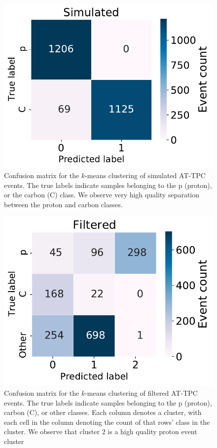 \documentclass[preprint,12pt]{elsarticle}
\begin{document}
\begin{figure}
\centering
	\includegraphics[width=\textwidth]{custom_work/Simulatedcache_conf_mat.pdf} 
	\caption[Pre-trained network - confusion matrices]{Confusion matrix for the $k$-means clustering of simulated AT-TPC events. The true labels indicate samples belonging to the p (proton), or the carbon (C) class. We observe very high quality separation between the proton and carbon classes.}\label{fig:clster_confmat_sim}
\end{figure}

\begin{figure}
\centering
	\includegraphics[width=\textwidth]{custom_work/Filteredcache_conf_mat.pdf}
	\caption[Pre-trained network - confusion matrices]{Confusion matrix for the $k$-means clustering of filtered AT-TPC events. The true labels indicate samples belonging to the p (proton), carbon (C), or other classes. Each column denotes a cluster, with each cell in the column denoting the count of that rows' class in the cluster. We observe that cluster 2 is a high quality proton event cluster }\label{fig:clster_confmati_filt}
\end{figure}
\end{document}

